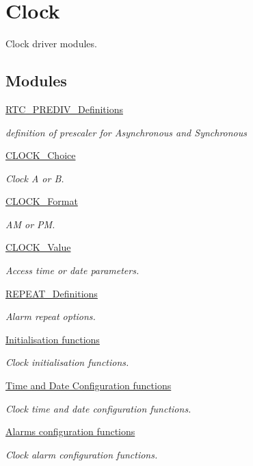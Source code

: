 \hypertarget{group___clock}{}\section{Clock}
\label{group___clock}


Clock driver modules.  


\subsection*{Modules}
\begin{DoxyCompactItemize}
\item 
\hyperlink{group___r_t_c___p_r_e_d_i_v___definitions}{R\+T\+C\+\_\+\+P\+R\+E\+D\+I\+V\+\_\+\+Definitions}
\begin{DoxyCompactList}\small\item\em definition of prescaler for Asynchronous and Synchronous \end{DoxyCompactList}\item 
\hyperlink{group___c_l_o_c_k___choice}{C\+L\+O\+C\+K\+\_\+\+Choice}
\begin{DoxyCompactList}\small\item\em Clock A or B. \end{DoxyCompactList}\item 
\hyperlink{group___c_l_o_c_k___format}{C\+L\+O\+C\+K\+\_\+\+Format}
\begin{DoxyCompactList}\small\item\em AM or PM. \end{DoxyCompactList}\item 
\hyperlink{group___c_l_o_c_k___value}{C\+L\+O\+C\+K\+\_\+\+Value}
\begin{DoxyCompactList}\small\item\em Access time or date parameters. \end{DoxyCompactList}\item 
\hyperlink{group___r_e_p_e_a_t___definitions}{R\+E\+P\+E\+A\+T\+\_\+\+Definitions}
\begin{DoxyCompactList}\small\item\em Alarm repeat options. \end{DoxyCompactList}\item 
\hyperlink{group___initialisation}{Initialisation functions}
\begin{DoxyCompactList}\small\item\em Clock initialisation functions. \end{DoxyCompactList}\item 
\hyperlink{group___time___date}{Time and Date Configuration functions}
\begin{DoxyCompactList}\small\item\em Clock time and date configuration functions. \end{DoxyCompactList}\item 
\hyperlink{group___alarms}{Alarms configuration functions}
\begin{DoxyCompactList}\small\item\em Clock alarm configuration functions. \end{DoxyCompactList}\end{DoxyCompactItemize}
